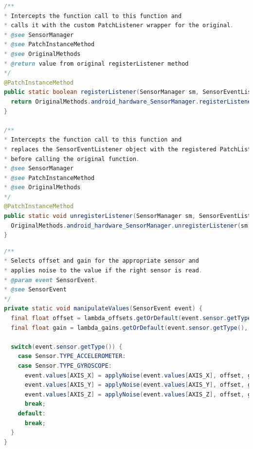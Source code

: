 \documentclass[11pt,
  oneside,openany,    %
]{scrreprt}
\begin{document}
\begin{lstlisting}[language=java, caption=Intercept Methods, label=lst:intercept_method]
/**
* Intercepts the function call to this function and
* calls it with the custom PatchListener wrapper for the original.
* @see SensorManager
* @see PatchInstanceMethod
* @see OriginalMethods
* @return value from original registerListener method
*/
@PatchInstanceMethod
public static boolean registerListener(SensorManager sm, SensorEventListener listener, Sensor sensor, int samplingPeriodUs) {
  return OriginalMethods.android_hardware_SensorManager.registerListener(sm, addListener(listener, sensor), sensor, samplingPeriodUs);
}

/**
* Intercepts the function call to this function and
* replaces the SensorEventListener object with the registered PatchListener
* before calling the original function.
* @see SensorManager
* @see PatchInstanceMethod
* @see OriginalMethods
*/
@PatchInstanceMethod
public static void unregisterListener(SensorManager sm, SensorEventListener listener) {
  OriginalMethods.android_hardware_SensorManager.unregisterListener(sm, removeListener(listener, null));
}
\end{lstlisting}
\pagebreak
\begin{lstlisting}[language=java, caption=Noise Generating Function, label=lst:noise_gen_func]
/**
* Selects offset and gain for the appropriate sensor and
* applies noise to the value if the right sensor is read.
* @param event SensorEvent.
* @see SensorEvent
*/
private static void manipulateValues(SensorEvent event) {
  final float offset = lambda_offsets.getOrDefault(event.sensor.getType(), 0.0f);
  final float gain = lambda_gains.getOrDefault(event.sensor.getType(), 0.0f);

  switch(event.sensor.getType()) {
    case Sensor.TYPE_ACCELEROMETER:
    case Sensor.TYPE_GYROSCOPE:
      event.values[AXIS_X] = applyNoise(event.values[AXIS_X], offset, gain);
      event.values[AXIS_Y] = applyNoise(event.values[AXIS_Y], offset, gain);
      event.values[AXIS_Z] = applyNoise(event.values[AXIS_Z], offset, gain);
      break;
    default:
      break;
  }
}
\end{lstlisting}
\end{document}
